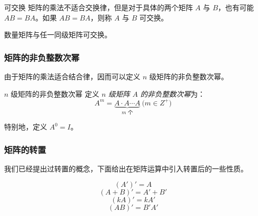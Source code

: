 \begin{definition}{可交换}
	矩阵的乘法不适合交换律，但是对于具体的两个矩阵 $A$ 与 $B$，也有可能 $AB = BA$。如果 $AB = BA$，则称 $A$ 与 $B$ 可交换。
\end{definition}

\begin{theorem}
	数量矩阵与任一同级矩阵可交换。
\end{theorem}

\subsubsection{矩阵的非负整数次幂}

由于矩阵的乘法适合结合律，因而可以定义 $n$ 级矩阵的非负整数次幂。

\begin{definition}{$n$ 级矩阵的非负整数次幂}
	定义 \emph{$n$ 级矩阵 $A$ 的非负整数次幂}为：
	$$
	A^m = \underset{\text{$m$ 个}}{\underbrace{A \cdot A \cdots A}} \pod{m \in Z^+}
	$$

	特别地，定义 $A^0 = I$。
\end{definition}

\subsubsection{矩阵的转置}

我们已经提出过转置的概念，下面给出在矩阵运算中引入转置后的一些性质。

\begin{theorem}
	$$
	(A')' = A
	$$$$
	(A + B)' = A' + B'
	$$$$
	(kA)' = kA'
	$$$$
	(AB)' = B'A'
	$$
\end{theorem}